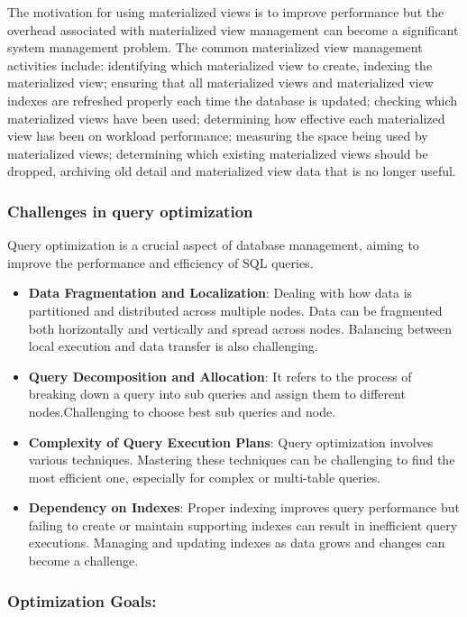 The motivation for using materialized views is to improve performance but the overhead associated with materialized view management can become a significant system management problem. The common materialized view management activities include: identifying which materialized view to create, indexing the materialized view; ensuring that all materialized views and materialized view indexes are refreshed properly each time the database is updated; checking which materialized views have been used; determining how effective each materialized view has been on workload performance; measuring the space being used by materialized views; determining which existing materialized views should be dropped,  archiving old detail and materialized view data that is no longer useful.\cite{Ashadevi2008CostEA,1363763}

\subsubsection{Challenges in query optimization} Query optimization is a crucial aspect of database management, aiming to improve the performance and efficiency of SQL queries.
\begin{itemize}
    \item\textbf{Data Fragmentation and Localization}: Dealing with how data is partitioned and distributed across multiple nodes. Data can be fragmented both horizontally and vertically and spread across nodes. Balancing between local execution and data transfer is also challenging. 
    \item\textbf{Query Decomposition and Allocation}: It refers to the process of breaking down a query into sub queries and assign them to different nodes.Challenging to choose best sub queries and node.
    \item\textbf{Complexity of Query Execution Plans}: Query optimization involves various techniques. Mastering these techniques can be challenging to find the most efficient one, especially for complex or multi-table queries.
    \item\textbf{Dependency on Indexes}: Proper indexing improves query performance but failing to create or maintain supporting indexes can result in inefficient query executions. Managing and updating indexes as data grows and changes can become a challenge.\\
    \cite{team-2020,etutorials-03-2024,editor-ijmter-2015}
\end{itemize}
\subsubsection*{Optimization Goals:}

